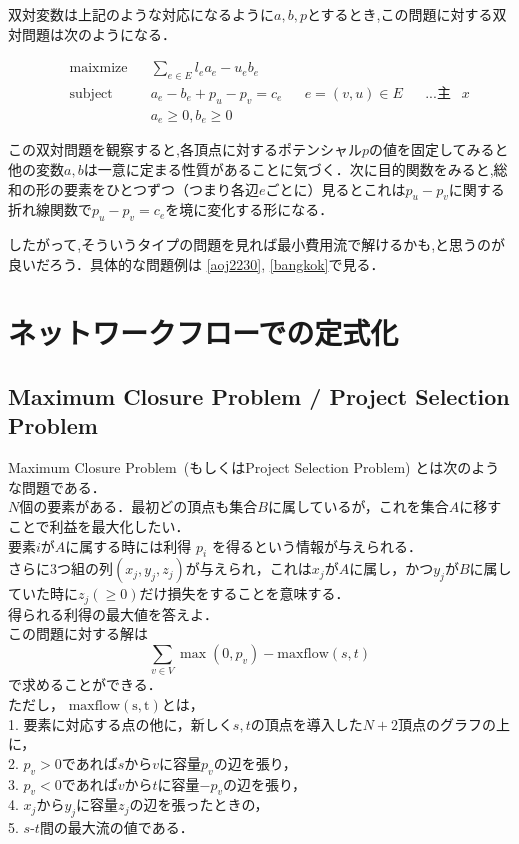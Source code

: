 \documentclass[13pt]{jarticle}
\theoremstyle{nonitalic} %
\begin{document}
双対変数は上記のような対応になるように$a,b,p$とするとき,この問題に対する双対問題は次のようになる．

\begin{align}
&&&&&\textrm{maixmize}   && \sum_{e\in E} l_e a_e - u_e b_e  \\
&&&&&\textrm{subject to} && a_e - b_e + p_u - p_v = c_e && e = (v,u) \in E  && \textrm{...主変数$x$}& \\
&&&&& && a_e \geq 0, b_e \geq 0 &&&&&&&&
\end{align}

この双対問題を観察すると,各頂点に対するポテンシャル$p$の値を固定してみると他の変数$a,b$は一意に定まる性質があることに気づく．次に目的関数をみると,総和の形の要素をひとつずつ（つまり各辺$e$ごとに）見るとこれは$p_u-p_v$に関する折れ線関数で$p_u-p_v=c_e$を境に変化する形になる．

したがって,そういうタイプの問題を見れば最小費用流で解けるかも,と思うのが良いだろう．具体的な問題例は \ref{aoj2230}, \ref{bangkok}で見る．

\section{ネットワークフローでの定式化}
\subsection{Maximum Closure Problem / Project Selection Problem}
Maximum Closure Problem~(もしくはProject Selection Problem) とは次のような問題である．\\

$N$個の要素がある．最初どの頂点も集合$B$に属しているが，これを集合$A$に移すことで利益を最大化したい． \\
要素$i$が$A$に属する時には利得 $p_i$ を得るという情報が与えられる． \\
さらに3つ組の列$(x_j, y_j, z_j)$が与えられ，これは$x_j$が$A$に属し，かつ$y_j$が$B$に属していた時に$z_j(\geq 0)$だけ損失をすることを意味する． \\
得られる利得の最大値を答えよ． \\


この問題に対する解は
\[ \sum_{v \in V } \max(0,p_v) - \mathrm{maxflow}(s,t) \]
で求めることができる．\\
ただし， $\mathrm{maxflow(s,t)}$とは，\\
1. 要素に対応する点の他に，新しく$s,t$の頂点を導入した$N+2$頂点のグラフの上に，\\
2. $p_v>0$であれば$s$から$v$に容量$p_v$の辺を張り，\\
3. $p_v<0$であれば$v$から$t$に容量$-p_v$の辺を張り，\\
4. $x_j$から$y_j$に容量$z_j$の辺を張ったときの，\\
5. $s$-$t$間の最大流の値である．
\end{document}
